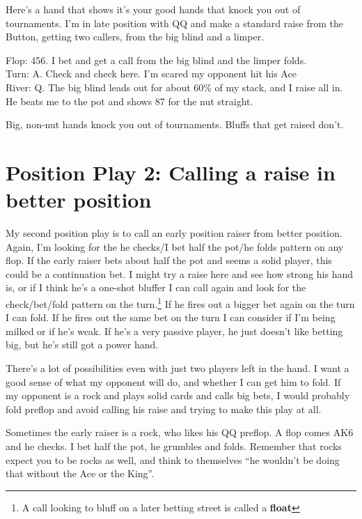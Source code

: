 
Here's a hand that shows it's your good hands that knock you out of tournaments.
I'm in late position with QQ and make a standard raise from the Button,
getting two callers, from the big blind and a limper.

Flop: 456. I bet and get a call from the big blind and the limper folds. \\
Turn: A. Check and check here. I'm scared my opponent hit his Ace \\
River: Q.  The big blind leads out for about 60\% of my stack, and I raise all
in. He beats me to the pot and shows 87 for the nut straight.

Big, non-nut hands knock you out of tournaments. Bluffs that get
raised don't.

\section{Position Play 2: Calling a raise in better position}

My second position play is to call an early position raiser from better
position. Again, I'm looking for the he checks/I bet half the pot/he folds
pattern on any flop. If the early raiser bets about half the
pot and seems a solid player, this could be a continuation bet. I might
try a raise here and see how strong his hand is, or if I think he's a
one-shot bluffer I can call again and look for the check/bet/fold
pattern on the turn.\footnote{A call looking to bluff on a later betting
street is called a \textbf{float}} If he fires out a bigger bet again on the turn I
can fold. If he fires out the same bet on the turn I can consider if
I'm being milked or if he's weak. If he's a very passive player,
he just doesn't like betting big, but he's still got a power hand.

There's a lot of possibilities even with just two players left in the hand.
I want a good sense of what my opponent will do, and whether I can
get him to fold. If my opponent is a rock and plays solid cards
and calls big bets, I would probably fold preflop and avoid calling his raise
and trying to make this play at all.

Sometimes the early raiser is a rock, who likes his QQ preflop.
A flop comes AK6 and he checks. I bet half the pot, he grumbles and
folds. Remember that rocks expect you to be rocks as well, and think
to themselves ``he wouldn't be doing that without the Ace or the King''.

